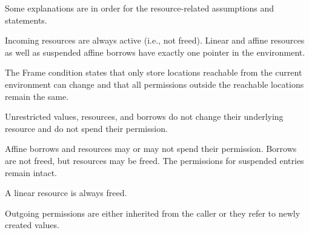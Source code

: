 \SoundnessThm

Some explanations are in order for the resource-related assumptions
and statements.

Incoming resources are always active (i.e., not freed).
Linear and affine resources as well as suspended affine borrows have
exactly one pointer in the environment.

The Frame condition states that only store locations reachable from
the current environment can change and that all permissions outside
the reachable locations remain the same.

Unrestricted values, resources, and borrows do not change their
underlying resource and do not spend their permission.

Affine borrows and resources may or may not spend their
permission. Borrows are not freed, but resources may be freed. The
permissions for suspended entries remain intact.


A linear resource is always freed.

Outgoing permissions are either inherited from the caller or they
refer to newly created values.


